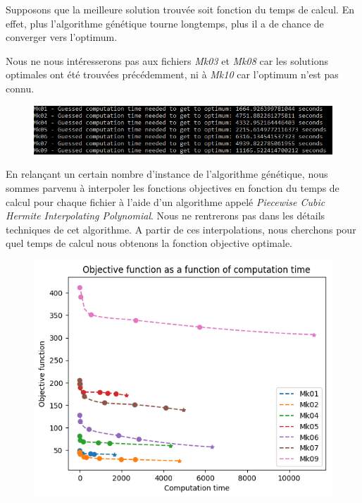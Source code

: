 Supposons que la meilleure solution trouvée soit fonction du temps de calcul. En effet, plus l'algorithme génétique tourne longtemps, plus il a de chance de converger vers l'optimum.

Nous ne nous intéresserons pas aux fichiers \textit{Mk03} et \textit{Mk08} car les solutions optimales ont été trouvées précédemment, ni à \textit{Mk10} car l'optimum n'est pas connu.

\begin{figure}[!h]
    \centering
    \includegraphics[width=\linewidth]{report/Pictures/guessed_computation_time_brandimarte.png}
\end{figure}

En relançant un certain nombre d'instance de l'algorithme génétique, nous sommes parvenu à interpoler les fonctions objectives en fonction du temps de calcul pour chaque fichier à l'aide d'un algorithme appelé \textit{Piecewise Cubic Hermite Interpolating Polynomial}. Nous ne rentrerons pas dans les détails techniques de cet algorithme. A partir de ces interpolations, nous cherchons pour quel temps de calcul nous obtenons la fonction objective optimale.

\begin{figure}[!h]
    \centering
    \includegraphics[width=\linewidth]{report/Pictures/objective_function_as_function_of_time.png}
\end{figure}

